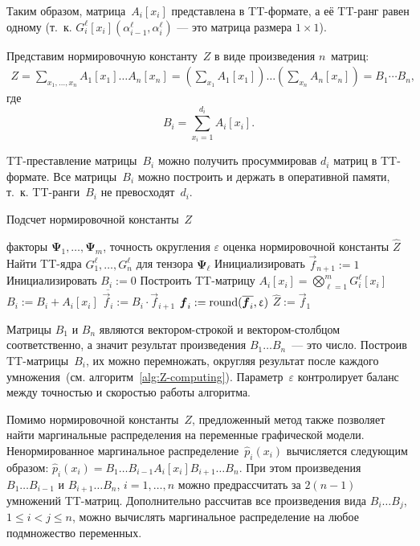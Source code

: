 Таким образом, матрица~$A_i[x_i]$ представлена в TT\hyp{}формате, а её TT\hyp{}ранг равен одному (т.~к. $G^{\ell}_i[x_i](\alpha^{\ell}_{i - 1}, \alpha^{\ell}_i)$ --- это матрица размера $1 \times 1$).

Представим нормировочную константу~$Z$ в виде произведения $n$~матриц:
\begin{multline*}
Z = \sum_{x_1, \dots, x_n}  A_1[x_1] \ldots  A_n[x_n]
= \left ( \sum_{x_1} A_1[x_1] \right ) \ldots  \left ( \sum_{x_n} A_n[x_n] \right ) = B_1 \dotsm  B_n,
\end{multline*}
где
\begin{equation*}
B_i = \sum_{x_i = 1}^{d_i} A_i[x_i].
\end{equation*}

TT\hyp{}преставление матрицы~$B_i$ можно получить просуммировав $d_i$ матриц в TT\hyp{}формате. Все матрицы~$B_i$ можно построить и держать в оперативной памяти, т.~к. TT\hyp{}ранги~$B_i$ не превосходят~$d_i$.

\begin{algorithm}[tb]
   \caption{Подсчет нормировочной константы~$Z$}
   \label{alg:Z-computing}
\begin{algorithmic}[1]
   \REQUIRE факторы $\mathbf{\Psi}_1, \dots, \mathbf{\Psi}_m$, точность округления $\varepsilon$
   \ENSURE оценка нормировочной константы $\widehat{Z}$
   \STATE Найти TT\hyp{}ядра $G^{\ell}_1, \dots, G^{\ell}_n$ для тензора $\mathbf{\Psi}_{\ell}$
   \ENDFOR
   \STATE Инициализировать $\vec{f}_{n + 1} := 1$
     \STATE Инициализировать $B_i := 0$
       \STATE Построить TT\hyp{}матрицу $A_i[x_i] = \bigotimes_{\ell = 1}^m G^\ell_i[x_i]$
       \STATE $B_i := B_i + A_i[x_i]$
     \ENDFOR
     \STATE $\overline{\vec{f}_i} := B_i \cdot \vec{f}_{i + 1}$
     \STATE $\boldsymbol{f}_i := \operatorname{round}(\overline{\boldsymbol{f}_i}, \upvarepsilon)$
   \ENDFOR
   \STATE $\widehat{Z} := \vec{f}_1$
\end{algorithmic}
\end{algorithm}

Матрицы $B_1$ и $B_n$ являются вектором-строкой и вектором-столбцом соответственно, а значит результат произведения $B_1 \ldots B_n$~--- это число.
Построив TT\hyp{}матрицы~$B_i$, их можно перемножать, округляя результат после каждого умножения~(см. алгоритм~\ref{alg:Z-computing}). Параметр~$\varepsilon$ контролирует баланс между точностью и скоростью работы алгоритма.

Помимо нормировочной константы~$Z$, предложенный метод также позволяет найти маргинальные распределения на переменные графической модели. Ненормированное маргинальное распределение~$\hat{p}_i(x_i)$ вычисляется следующим образом:
$
\hat{p}_i(x_i) = B_1\ldots B_{i-1} A_i[x_i] B_{i+1}\ldots B_{n}.
$
При этом произведения~$B_1\ldots B_{i-1}$ и $B_{i+1}\ldots B_{n}$, $i=1,\ldots,n$ можно предрассчитать за $2 (n - 1)$ умножений TT\hyp{}матриц. Дополнительно рассчитав все произведения вида $B_i\ldots B_j$, $1 \leq i < j \leq n$, можно вычислять маргинальное распределение на любое подмножество переменных.

